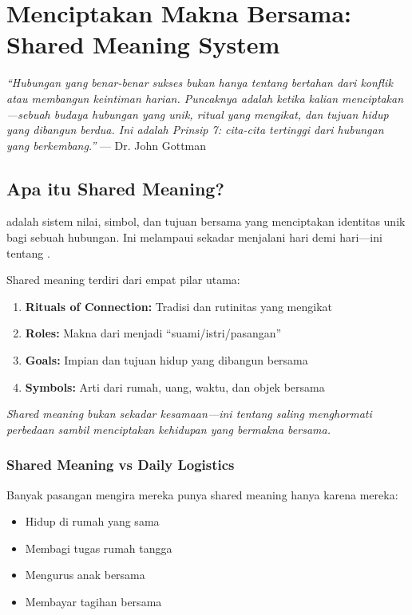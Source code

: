 \chapter{Menciptakan Makna Bersama: Shared Meaning System}

\begin{insightbox}
\textit{``Hubungan yang benar-benar sukses bukan hanya tentang bertahan dari konflik atau membangun keintiman harian. Puncaknya adalah ketika kalian menciptakan ---sebuah budaya hubungan yang unik, ritual yang mengikat, dan tujuan hidup yang dibangun berdua. Ini adalah Prinsip 7: cita-cita tertinggi dari hubungan yang berkembang.''} --- Dr. John Gottman
\end{insightbox}

\section{Apa itu Shared Meaning?}

 adalah sistem nilai, simbol, dan tujuan bersama yang menciptakan identitas unik bagi sebuah hubungan. Ini melampaui sekadar menjalani hari demi hari---ini tentang .

\begin{praktikbox}
Shared meaning terdiri dari empat pilar utama:

\begin{enumerate}
    \item \textbf{Rituals of Connection:} Tradisi dan rutinitas yang mengikat
    \item \textbf{Roles:} Makna dari menjadi ``suami/istri/pasangan''
    \item \textbf{Goals:} Impian dan tujuan hidup yang dibangun bersama
    \item \textbf{Symbols:} Arti dari rumah, uang, waktu, dan objek bersama
\end{enumerate}

\textit{Shared meaning bukan sekadar kesamaan---ini tentang saling menghormati perbedaan sambil menciptakan kehidupan yang bermakna bersama.}
\end{praktikbox}

\subsection{Shared Meaning vs Daily Logistics}

Banyak pasangan mengira mereka punya shared meaning hanya karena mereka:
\begin{itemize}
    \item Hidup di rumah yang sama
    \item Membagi tugas rumah tangga
    \item Mengurus anak bersama
    \item Membayar tagihan bersama
\end{itemize}

